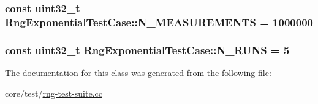 \subsubsection[{\texorpdfstring{N\+\_\+\+M\+E\+A\+S\+U\+R\+E\+M\+E\+N\+TS}{N_MEASUREMENTS}}]{\setlength{\rightskip}{0pt plus 5cm}const uint32\+\_\+t Rng\+Exponential\+Test\+Case\+::\+N\+\_\+\+M\+E\+A\+S\+U\+R\+E\+M\+E\+N\+TS = 1000000\hspace{0.3cm}{\ttfamily [static]}}\hypertarget{classRngExponentialTestCase_a5cc43f88e4833980decd750046f9d989}{}\label{classRngExponentialTestCase_a5cc43f88e4833980decd750046f9d989}
\subsubsection[{\texorpdfstring{N\+\_\+\+R\+U\+NS}{N_RUNS}}]{\setlength{\rightskip}{0pt plus 5cm}const uint32\+\_\+t Rng\+Exponential\+Test\+Case\+::\+N\+\_\+\+R\+U\+NS = 5\hspace{0.3cm}{\ttfamily [static]}}\hypertarget{classRngExponentialTestCase_a86f4a0ef3e982f89b5f9998a8a45855c}{}\label{classRngExponentialTestCase_a86f4a0ef3e982f89b5f9998a8a45855c}


The documentation for this class was generated from the following file\+:\begin{DoxyCompactItemize}
\item 
core/test/\hyperlink{rng-test-suite_8cc}{rng-\/test-\/suite.\+cc}\end{DoxyCompactItemize}
